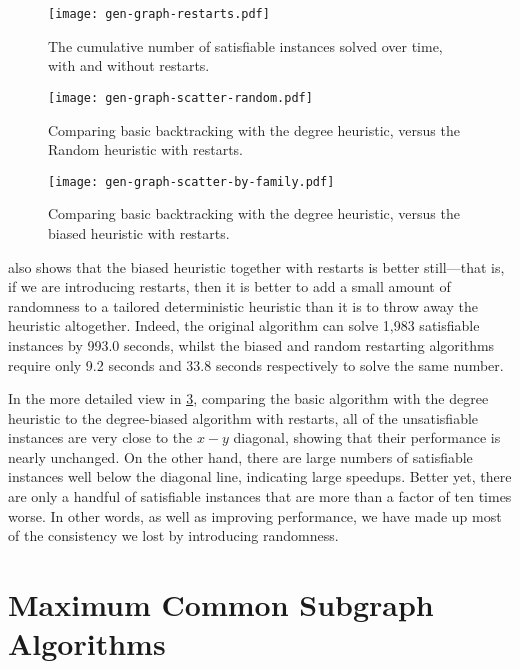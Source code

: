 \documentclass{article}
\begin{document}
\begin{figure}[p]
    \centering
    \texttt{[image: gen-graph-restarts.pdf]}

    \caption{The cumulative number of satisfiable instances solved over time, with and without
    restarts.}
    \label{figure:restarts}
\end{figure}

\begin{figure}[p]
    \centering
    \texttt{[image: gen-graph-scatter-random.pdf]}
    \caption{Comparing basic backtracking with the degree heuristic, versus the Random heuristic
    with restarts.}
    \label{figure:scatter-random}
\end{figure}

\begin{figure}[p]
    \centering
    \texttt{[image: gen-graph-scatter-by-family.pdf]}

    \caption{Comparing basic backtracking with the degree heuristic, versus the biased
    heuristic with restarts.}
    \label{figure:scatter-by-family}
\end{figure}

 also shows that the biased heuristic together with restarts is better
still---that is, if we are introducing restarts, then it is better to add a small amount of
randomness to a tailored deterministic heuristic than it is to throw away the heuristic altogether.
Indeed, the original algorithm can solve 1,983 satisfiable instances by 993.0 seconds, whilst the
biased and random restarting algorithms require only 9.2 seconds and 33.8 seconds respectively to
solve the same number.

In the more detailed view in \cref{figure:scatter-by-family}, comparing the basic algorithm with the
degree heuristic to the degree-biased algorithm with restarts, all of the unsatisfiable instances
are very close to the $x-y$ diagonal, showing that their performance is nearly unchanged. On the
other hand, there are large numbers of satisfiable instances well below the diagonal line,
indicating large speedups.  Better yet, there are only a handful of satisfiable instances that are
more than a factor of ten times worse. In other words, as well as improving performance, we have
made up most of the consistency we lost by introducing randomness.

\section{Maximum Common Subgraph Algorithms}
\end{document}

